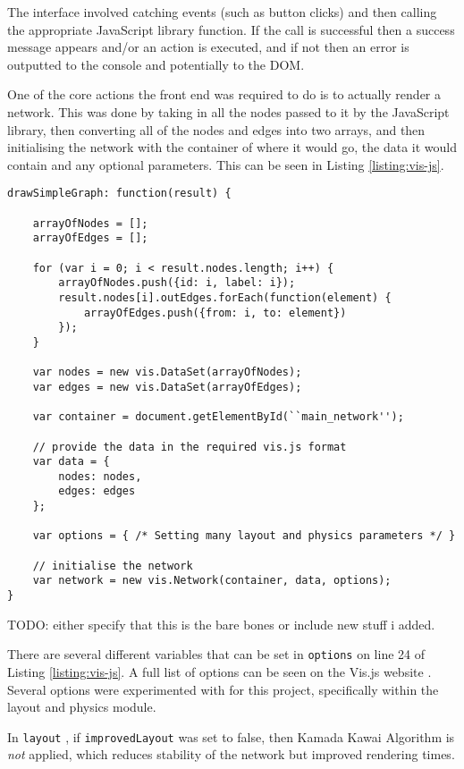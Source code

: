\documentclass[../dissertation.tex]{subfiles}
\begin{document}
The interface involved catching events (such as button clicks) and then calling the appropriate JavaScript library function. If the call is successful then a success message appears and/or an action is executed, and if not then an error is outputted to the console and potentially to the DOM. 

One of the core actions the front end was required to do is to actually render a network. This was done by taking in all the nodes passed to it by the JavaScript library, then converting all of the nodes and edges into two arrays, and then initialising the network with the container of where it would go, the data it would contain and any optional parameters. This can be seen in Listing \ref{listing:vis-js}.

\begin{lstlisting}[caption=How to create a network using Vis.js, label=listing:vis-js]
drawSimpleGraph: function(result) {

    arrayOfNodes = [];
    arrayOfEdges = [];
    
    for (var i = 0; i < result.nodes.length; i++) {
        arrayOfNodes.push({id: i, label: i});
        result.nodes[i].outEdges.forEach(function(element) {
            arrayOfEdges.push({from: i, to: element})
        });
    }
    
    var nodes = new vis.DataSet(arrayOfNodes);
    var edges = new vis.DataSet(arrayOfEdges);
    
    var container = document.getElementById(``main_network'');
    
    // provide the data in the required vis.js format
    var data = {
        nodes: nodes,
        edges: edges
    };
    
    var options = { /* Setting many layout and physics parameters */ }
    
    // initialise the network
    var network = new vis.Network(container, data, options);
}
\end{lstlisting}

TODO: either specify that this is the bare bones or include new stuff i added.

There are several different variables that can be set in \texttt{options} on line 24 of Listing \ref{listing:vis-js}. A full list of options can be seen on the Vis.js website \cite{visjsoptions}. Several options were experimented with for this project, specifically within the layout and physics module. 


In \texttt{layout} \cite{visjslayout}, if \texttt{improvedLayout} was set to false, then Kamada Kawai Algorithm \cite{kamada1989algorithm} is \emph{not} applied, which reduces stability of the network but improved rendering times. 
\end{document}
